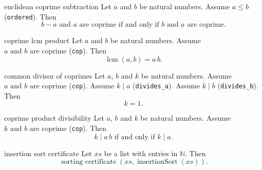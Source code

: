 \begin{cleanresult}{euclidean coprime subtraction}
Let $a$ and $b$ be natural numbers.
Assume $a\le b$ (\texttt{ordered}).
Then \[b-a\text{ and }a\text{ are coprime}\text{ if and only if }b\text{ and }a\text{ are coprime}.\]
\end{cleanresult}

\begin{cleanresult}{coprime lcm product}
Let $a$ and $b$ be natural numbers.
Assume $a\text{ and }b\text{ are coprime}$ (\texttt{cop}).
Then \[\operatorname{lcm}(a,b)=a\,b.\]
\end{cleanresult}

\begin{cleanresult}{common divisor of coprimes}
Let $a$, $b$ and $k$ be natural numbers.
Assume $a\text{ and }b\text{ are coprime}$ (\texttt{cop}).
Assume $k\mid a$ (\texttt{divides\_a}).
Assume $k\mid b$ (\texttt{divides\_b}).
Then \[k=1.\]
\end{cleanresult}

\begin{cleanresult}{coprime product divisibility}
Let $a$, $b$ and $k$ be natural numbers.
Assume $k\text{ and }b\text{ are coprime}$ (\texttt{cop}).
Then \[k\mid a\,b\text{ if and only if }k\mid a.\]
\end{cleanresult}

\begin{cleanresult}{insertion sort certificate}
Let $\mathit{xs}$ be a list with entries in $\mathbb{N}$.
Then \[\operatorname{sorting\ certificate}(\mathit{xs}, \operatorname{insertionSort}(\mathit{xs})).\]
\par{}
\end{cleanresult}

